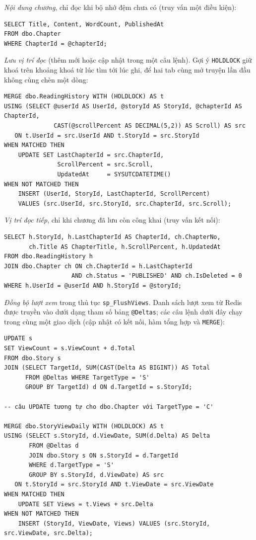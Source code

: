 \textit{Nội dung chương}, chỉ đọc khi bộ nhớ đệm chưa có (truy vấn một điều kiện):
\begin{verbatim}
SELECT Title, Content, WordCount, PublishedAt
FROM dbo.Chapter
WHERE ChapterId = @chapterId;
\end{verbatim}

\textit{Lưu vị trí đọc} (thêm mới hoặc cập nhật trong một câu lệnh). Gợi ý \texttt{HOLDLOCK} giữ khoá trên khoảng khoá từ lúc tìm tới lúc ghi, để hai tab cùng mở truyện lần đầu không cùng chèn một dòng:
\begin{verbatim}
MERGE dbo.ReadingHistory WITH (HOLDLOCK) AS t
USING (SELECT @userId AS UserId, @storyId AS StoryId, @chapterId AS ChapterId,
              CAST(@scrollPercent AS DECIMAL(5,2)) AS Scroll) AS src
   ON t.UserId = src.UserId AND t.StoryId = src.StoryId
WHEN MATCHED THEN
    UPDATE SET LastChapterId = src.ChapterId,
               ScrollPercent = src.Scroll,
               UpdatedAt     = SYSUTCDATETIME()
WHEN NOT MATCHED THEN
    INSERT (UserId, StoryId, LastChapterId, ScrollPercent)
    VALUES (src.UserId, src.StoryId, src.ChapterId, src.Scroll);
\end{verbatim}

\textit{Vị trí đọc tiếp}, chỉ khi chương đã lưu còn công khai (truy vấn kết nối):
\begin{verbatim}
SELECT h.StoryId, h.LastChapterId AS ChapterId, ch.ChapterNo,
       ch.Title AS ChapterTitle, h.ScrollPercent, h.UpdatedAt
FROM dbo.ReadingHistory h
JOIN dbo.Chapter ch ON ch.ChapterId = h.LastChapterId
                   AND ch.Status = 'PUBLISHED' AND ch.IsDeleted = 0
WHERE h.UserId = @userId AND h.StoryId = @storyId;
\end{verbatim}

\textit{Đồng bộ lượt xem} trong thủ tục \texttt{sp\_FlushViews}. Danh sách lượt xem từ Redis được truyền vào dưới dạng tham số bảng \texttt{@Deltas}; các câu lệnh dưới đây chạy trong cùng một giao dịch (cập nhật có kết nối, hàm tổng hợp và \texttt{MERGE}):
\begin{verbatim}
UPDATE s
SET ViewCount = s.ViewCount + d.Total
FROM dbo.Story s
JOIN (SELECT TargetId, SUM(CAST(Delta AS BIGINT)) AS Total
      FROM @Deltas WHERE TargetType = 'S'
      GROUP BY TargetId) d ON d.TargetId = s.StoryId;

-- câu UPDATE tương tự cho dbo.Chapter với TargetType = 'C'

MERGE dbo.StoryViewDaily WITH (HOLDLOCK) AS t
USING (SELECT s.StoryId, d.ViewDate, SUM(d.Delta) AS Delta
       FROM @Deltas d
       JOIN dbo.Story s ON s.StoryId = d.TargetId
       WHERE d.TargetType = 'S'
       GROUP BY s.StoryId, d.ViewDate) AS src
   ON t.StoryId = src.StoryId AND t.ViewDate = src.ViewDate
WHEN MATCHED THEN
    UPDATE SET Views = t.Views + src.Delta
WHEN NOT MATCHED THEN
    INSERT (StoryId, ViewDate, Views) VALUES (src.StoryId, src.ViewDate, src.Delta);
\end{verbatim}

